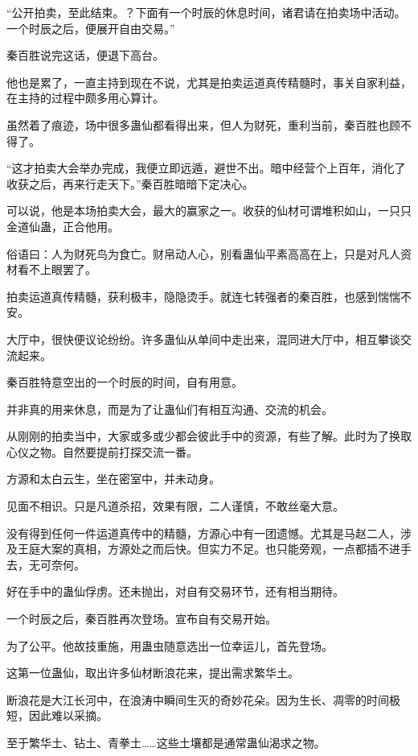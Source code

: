 
\begin{this_body}

“公开拍卖，至此结束。？下面有一个时辰的休息时间，诸君请在拍卖场中活动。一个时辰之后，便展开自由交易。”

秦百胜说完这话，便退下高台。

他也是累了，一直主持到现在不说，尤其是拍卖运道真传精髓时，事关自家利益，在主持的过程中颇多用心算计。

虽然着了痕迹，场中很多蛊仙都看得出来，但人为财死，重利当前，秦百胜也顾不得了。

“这才拍卖大会举办完成，我便立即远遁，避世不出。暗中经营个上百年，消化了收获之后，再来行走天下。”秦百胜暗暗下定决心。

可以说，他是本场拍卖大会，最大的赢家之一。收获的仙材可谓堆积如山，一只只金道仙蛊，正合他用。

俗语曰：人为财死鸟为食亡。财帛动人心，别看蛊仙平素高高在上，只是对凡人资材看不上眼罢了。

拍卖运道真传精髓，获利极丰，隐隐烫手。就连七转强者的秦百胜，也感到惴惴不安。

大厅中，很快便议论纷纷。许多蛊仙从单间中走出来，混同进大厅中，相互攀谈交流起来。

秦百胜特意空出的一个时辰的时间，自有用意。

并非真的用来休息，而是为了让蛊仙们有相互沟通、交流的机会。

从刚刚的拍卖当中，大家或多或少都会彼此手中的资源，有些了解。此时为了换取心仪之物。自然要提前打探交流一番。

方源和太白云生，坐在密室中，并未动身。

见面不相识。只是凡道杀招，效果有限，二人谨慎，不敢丝毫大意。

没有得到任何一件运道真传中的精髓，方源心中有一团遗憾。尤其是马赵二人，涉及王庭大案的真相，方源处之而后快。但实力不足。也只能旁观，一点都插不进手去，无可奈何。

好在手中的蛊仙俘虏。还未抛出，对自有交易环节，还有相当期待。

一个时辰之后，秦百胜再次登场。宣布自有交易开始。

为了公平。他故技重施，用蛊虫随意选出一位幸运儿，首先登场。

这第一位蛊仙，取出许多仙材断浪花来，提出需求繁华土。

断浪花是大江长河中，在浪涛中瞬间生灭的奇妙花朵。因为生长、凋零的时间极短，因此难以采摘。

至于繁华土、钻土、青拳土……这些土壤都是通常蛊仙渴求之物。


\end{this_body}
